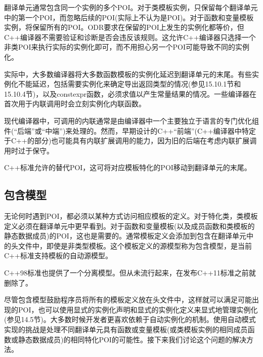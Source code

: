 翻译单元通常包含同一个实例的多个POI。对于类模板实例，只保留每个翻译单元中的第一个POI，而忽略后续的POI(实际上不认为是POI)。对于函数和变量模板实例，将保留所有的POI。ODR要求在保留的POI上发生的实例化都等价，但C++编译器不需要验证和诊断是否会违反该规则。这允许C++编译器只选择一个非类POI来执行实际的实例化即可，而不用担心另一个POI可能导致不同的实例化。

实际中，大多数编译器将大多数函数模板的实例化延迟到翻译单元的末尾。有些实例化不能延迟，包括需要实例化来确定导出返回类型的情况(参见15.10.1节和15.10.4节)，以及constexpr函数，必须求值以产生常量结果的情况。一些编译器在首次用于内联调用时会立刻实例化内联函数。

\begin{notice}
现代编译器中，可调用的内联通常是由编译器中一个主要独立于语言的专门优化组件(“后端”或“中端”)来处理的。然而，早期设计的C++“前端”(C++编译器中特定于C++的部分)也可能具有内联扩展调用的能力，因为旧的后端在考虑内联扩展调用时过于保守。
\end{notice}

C++标准允许的替代POI，这可将对应模板特化的POI移动到翻译单元的末尾。

\subsection{包含模型}

无论何时遇到POI，都必须以某种方式访问相应模板的定义。对于特化类，类模板定义必须在翻译单元中更早看到。对于函数和变量模板(以及成员函数和类模板的静态数据成员)的POI，这也是需要的。通常模板定义会添加到包含在翻译单元中的头文件中，即使是非类型模板。这个模板定义的源模型称为包含模型，是当前C++标准支持模板的自动源模型。

\begin{notice}
C++98标准也提供了一个分离模型。但从未流行起来，在发布C++11标准之前就删除了。
\end{notice}

尽管包含模型鼓励程序员将所有的模板定义放在头文件中，这样就可以满足可能出现的POI，也可以使用显式的实例化声明和显式的实例化定义来显式地管理实例化(参见14.5节)。大多数时候开发者更喜欢依赖于自动实例化的机制。使用自动模式实现的挑战是处理不同翻译单元具有函数或变量模板(或类模板实例的相同成员函数或静态数据成员)的相同特化POI的可能性。接下来我们讨论这个问题的解决方法。







